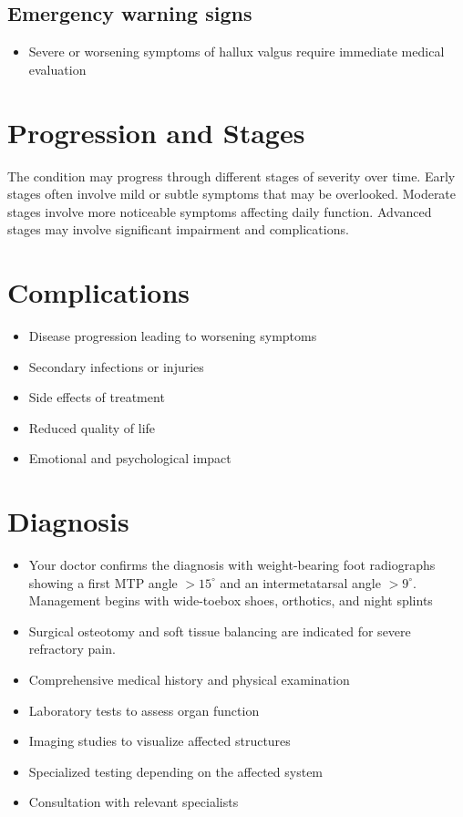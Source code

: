 \subsection{Emergency warning signs}
\begin{itemize}[noitemsep]
  \item Severe or worsening symptoms of hallux valgus require immediate medical evaluation
\end{itemize}
\section{Progression and Stages}
The condition may progress through different stages of severity over time. Early stages often involve mild or subtle symptoms that may be overlooked. Moderate stages involve more noticeable symptoms affecting daily function. Advanced stages may involve significant impairment and complications.
\section{Complications}
\begin{itemize}[noitemsep]
  \item Disease progression leading to worsening symptoms
  \item Secondary infections or injuries
  \item Side effects of treatment
  \item Reduced quality of life
  \item Emotional and psychological impact
\end{itemize}
\section{Diagnosis}
\begin{itemize}[noitemsep]
  \item Your doctor confirms the diagnosis with weight-bearing foot radiographs showing a first MTP angle $>15^\circ$ and an intermetatarsal angle $>9^\circ$. Management begins with wide-toebox shoes, orthotics, and night splints
  \item Surgical osteotomy and soft tissue balancing are indicated for severe refractory pain.
  \item Comprehensive medical history and physical examination
  \item Laboratory tests to assess organ function
  \item Imaging studies to visualize affected structures
  \item Specialized testing depending on the affected system
  \item Consultation with relevant specialists
\end{itemize}
